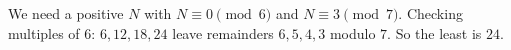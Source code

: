We need a positive $N$ with $N\equiv0\pmod6$ and $N\equiv3\pmod7$. Checking multiples of $6$: $6,12,18,24$ leave remainders $6,5,4,3$ modulo $7$. So the least is $\boxed{24}$.
